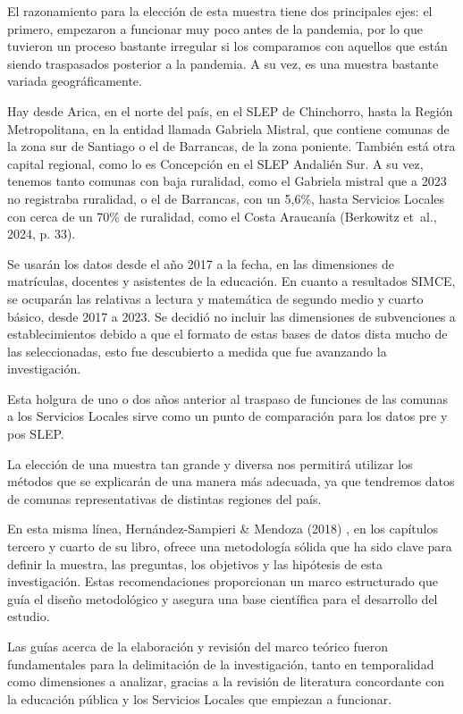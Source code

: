 \documentclass[
  12pt,
  letterpaper,
]{article}
\begin{document}
El razonamiento para la elección de esta muestra tiene dos principales ejes: el primero, empezaron a funcionar muy poco antes de la pandemia, por lo que tuvieron un proceso bastante irregular si los comparamos con aquellos que están siendo traspasados posterior a la pandemia.
A su vez, es una muestra bastante variada geográficamente.

Hay desde Arica, en el norte del país, en el SLEP de Chinchorro, hasta la Región Metropolitana, en la entidad llamada Gabriela Mistral, que contiene comunas de la zona sur de Santiago o el de Barrancas, de la zona poniente.
También está otra capital regional, como lo es Concepción en el SLEP Andalién Sur.
A su vez, tenemos tanto comunas con baja ruralidad, como el Gabriela mistral que a 2023 no registraba ruralidad, o el de Barrancas, con un 5,6\%, hasta Servicios Locales con cerca de un 70\% de ruralidad, como el Costa Araucanía (Berkowitz et~al., 2024, p. 33).

Se usarán los datos desde el año 2017 a la fecha, en las dimensiones de matrículas, docentes y asistentes de la educación.
En cuanto a resultados SIMCE, se ocuparán las relativas a lectura y matemática de segundo medio y cuarto básico, desde 2017 a 2023.
Se decidió no incluir las dimensiones de subvenciones a establecimientos debido a que el formato de estas bases de datos dista mucho de las seleccionadas, esto fue descubierto a medida que fue avanzando la investigación.

Esta holgura de uno o dos años anterior al traspaso de funciones de las comunas a los Servicios Locales sirve como un punto de comparación para los datos pre y pos SLEP.

La elección de una muestra tan grande y diversa nos permitirá utilizar los métodos que se explicarán de una manera más adecuada, ya que tendremos datos de comunas representativas de distintas regiones del país.

En esta misma línea, Hernández-Sampieri \& Mendoza (2018) , en los capítulos tercero y cuarto de su libro, ofrece una metodología sólida que ha sido clave para definir la muestra, las preguntas, los objetivos y las hipótesis de esta investigación.
Estas recomendaciones proporcionan un marco estructurado que guía el diseño metodológico y asegura una base científica para el desarrollo del estudio.

Las guías acerca de la elaboración y revisión del marco teórico fueron fundamentales para la delimitación de la investigación, tanto en temporalidad como dimensiones a analizar, gracias a la revisión de literatura concordante con la educación pública y los Servicios Locales que empiezan a funcionar.
\end{document}
